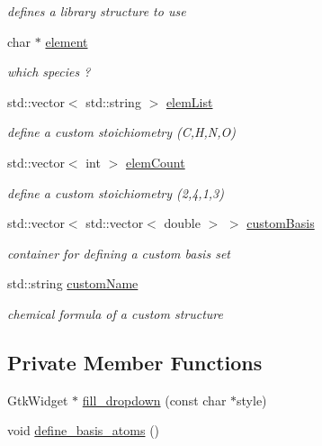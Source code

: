\begin{DoxyCompactItemize}
\begin{DoxyCompactList}\small\item\em defines a library structure to use \end{DoxyCompactList}\item 
char $\ast$ \hyperlink{class_gui_a2cb3d0d19735c9b7c0acaab6a236eb17}{element}
\begin{DoxyCompactList}\small\item\em which species ? \end{DoxyCompactList}\item 
std\+::vector$<$ std\+::string $>$ \hyperlink{class_gui_a33f327cf44f8231253a244d582cc7a9c}{elem\+List}
\begin{DoxyCompactList}\small\item\em define a custom stoichiometry (C,H,N,O) \end{DoxyCompactList}\item 
std\+::vector$<$ int $>$ \hyperlink{class_gui_af3e1a1fb1647e26d6a8a41e051d7433b}{elem\+Count}
\begin{DoxyCompactList}\small\item\em define a custom stoichiometry (2,4,1,3) \end{DoxyCompactList}\item 
std\+::vector$<$ std\+::vector$<$ double $>$ $>$ \hyperlink{class_gui_a0ba23b6cdb6a13e279ebb07098e265b5}{custom\+Basis}
\begin{DoxyCompactList}\small\item\em container for defining a custom basis set \end{DoxyCompactList}\item 
std\+::string \hyperlink{class_gui_a062cae171eaf8234689de5fe473692e3}{custom\+Name}
\begin{DoxyCompactList}\small\item\em chemical formula of a custom structure \end{DoxyCompactList}\end{DoxyCompactItemize}
\subsection*{Private Member Functions}
\begin{DoxyCompactItemize}
\item 
Gtk\+Widget $\ast$ \hyperlink{class_gui_aee0db69625943019e5a9b99ba22c0348}{fill\+\_\+dropdown} (const char $\ast$style)
\item 
void \hyperlink{class_gui_a6286dfbea72f91549c5af39c8a2ccc86}{define\+\_\+basis\+\_\+atoms} ()
\end{DoxyCompactItemize}
